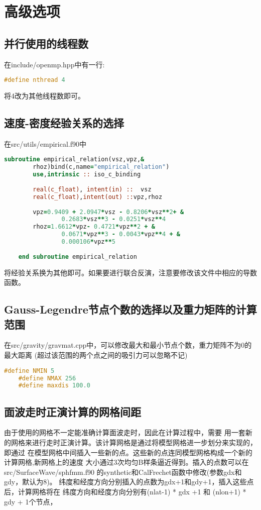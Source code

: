 \documentclass[10p,UTF8]{ctexart}
\begin{document}
   \section{高级选项}
    \subsection{并行使用的线程数}\label{线程数}
    在include/openmp.hpp中有一行:
    \begin{lstlisting}[language=c++]
    #define nthread 4
    \end{lstlisting}
    将4改为其他线程数即可。

    \subsection{速度-密度经验关系的选择}
    在src/utils/empirical.f90中 
    \begin{lstlisting}[language=fortran]
    subroutine empirical_relation(vsz,vpz,&
        rhoz)bind(c,name="empirical_relation")
        use,intrinsic :: iso_c_binding
      
        real(c_float), intent(in) ::  vsz
        real(c_float),intent(out) ::vpz,rhoz
      
        vpz=0.9409 + 2.0947*vsz - 0.8206*vsz**2+ &
                0.2683*vsz**3 - 0.0251*vsz**4
        rhoz=1.6612*vpz- 0.4721*vpz**2 + &
                0.0671*vpz**3 - 0.0043*vpz**4 + & 
                0.000106*vpz**5
      
    end subroutine empirical_relation
    \end{lstlisting}
    将经验关系换为其他即可。如果要进行联合反演，注意要修改该文件中相应的导数函数。

    \subsection{Gauss-Legendre节点个数的选择以及重力矩阵的计算范围}
    在src/gravity/gravmat.cpp中，可以修改最大和最小节点个数，重力矩阵不为0的最大距离
    (超过该范围的两个点之间的吸引力可以忽略不记)
    \begin{lstlisting}[language=c++]
    #define NMIN 5
    #define NMAX 256
    #define maxdis 100.0 
    \end{lstlisting}
    
    \subsection{面波走时正演计算的网格间距}
    由于使用的网格不一定能准确计算面波走时，因此在计算过程中，需要
    用一套新的网格来进行走时正演计算。该计算网格是通过将模型网格进一步划分来实现的，即通过
    在模型网格中间插入一些新的点。这些新的点连同模型网格构成一个新的计算网格,新网格上的速度
    大小通过3次均匀B样条逼近得到。插入的点数可以在
    src/SurfaceWave/sphfmm.f90 的synthetic和CalFrechet函数中修改(参数gdx和gdy，默认为8)。
    纬度和经度方向分别插入的点数为gdx+1和gdy+1，插入这些点后，计算网格将在
    纬度方向和经度方向分别有(nlat-1) * gdx +1 和 (nlon+1) * gdy + 1个节点，
\end{document}
